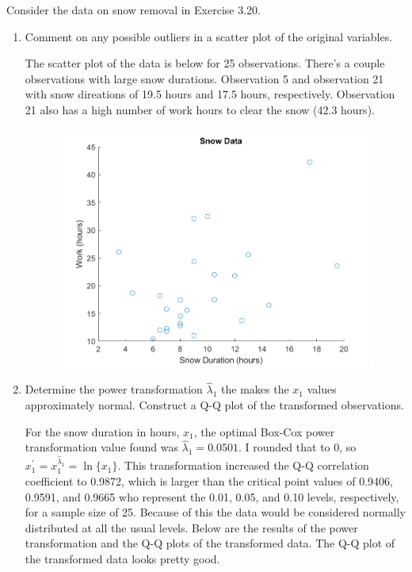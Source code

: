 Consider the data on snow removal in Exercise 3.20.
\begin{enumerate}[label= (\alph*)]
    \item Comment on any possible outliers in a scatter plot of the original variables.
    
    The scatter plot of the data is below for 25 observations. There's a couple observations with large snow durations. Observation 5 and observation 21 with snow direations of 19.5 hours and 17.5 hours, respectively. Observation 21 also has a high number of work hours to clear the snow (42.3 hours).

    \begin{center}
        \begin{figure}[H]
            \centering
            \includegraphics[scale=0.6]{./matlab/chapter-4/sol4.41.a.png}
        \end{figure}
    \end{center}

    \item Determine the power transformation $\hat{\lambda}_{1}$ the makes the $x_{1}$ values approximately
    normal. Construct a Q-Q plot of the transformed observations.

    For the snow duration in hours, $x_{1}$, the optimal Box-Cox power transformation value found was $\hat{\lambda}_{1} = 0.0501$.
    I rounded that to 0, so $x_{1}^{\prime} = x_{1}^{\hat{\lambda}_{1}} = \ln\{x_{1}\}$. This transformation increased the Q-Q correlation coefficient to 0.9872, which is larger than the critical point values of 0.9406, 0.9591, and 0.9665 who represent the 0.01, 0.05, and 0.10 levels, respectively, for a sample size of 25.
    Because of this the data would be considered normally distributed at all the usual levels.
    Below are the results of the power transformation and the Q-Q plots of the transformed data.
    The Q-Q plot of the transformed data looks pretty good.


\end{enumerate}

